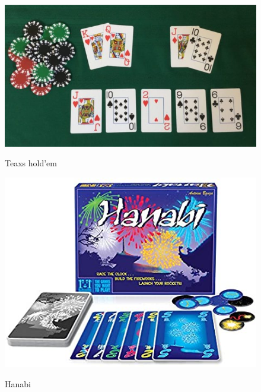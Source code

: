 \documentclass[notheorems, aspectratio=54]{beamer}
\begin{document}
\begin{frame}
  \vfill
  \begin{figure}[h]
  \begin{minipage}{0.45\textwidth}
    \includegraphics[width=\textwidth]{holdem-showdown-1280x720-600x338.jpg}
    \begin{center}
    Teaxs hold'em
    \end{center}
  \end{minipage}%
  \hspace{0.02\linewidth}
  \begin{minipage}{0.45\textwidth}
    \includegraphics[width=\textwidth]{hanabi.jpg}
    \begin{center}
    Hanabi
    \end{center}
    \end{minipage}
  \begin{minipage}{0.45\textwidth}

\end{minipage}
\end{figure}
\end{frame}
\end{document}
